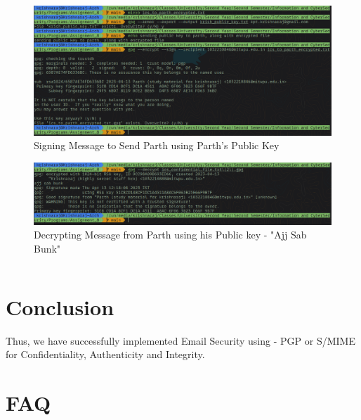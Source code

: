 \documentclass[openany]{book}
\begin{document}
\begin{figure}[H]
    \centering
    \includegraphics[width=.99\textwidth]{../Programs/Assignment_8/Screenshot_on_2023-04-13_at_12-31-43.png}
    \caption{Signing Message to Send Parth using Parth's Public Key}
\end{figure}
\begin{figure}[H]
    \centering
    \includegraphics[width=.99\textwidth]{../Programs/Assignment_8/Screenshot_on_2023-04-13_at_12-32-03.png}
    \caption{Decrypting Message from Parth using his Public key - "Ajj Sab Bunk"}
\end{figure}

\begin{verbatim}

\end{verbatim}


% 

\section{Conclusion}
Thus, we have successfully implemented Email Security using - PGP or S/MIME for Confidentiality, Authenticity and Integrity.
\clearpage

\section{FAQ}
\end{document}
